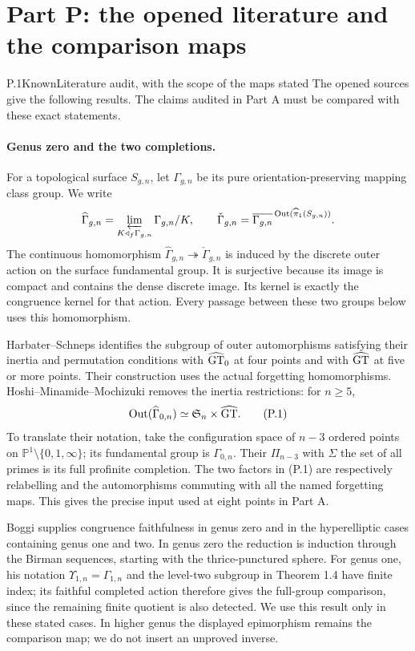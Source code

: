 \section{Part P: the opened literature and the comparison maps}

\begin{result}{P.1}{Known}{Literature audit, with the scope of the maps stated}
The opened sources give the following results. The claims audited in Part A must be compared with these exact statements.
\end{result}

\paragraph{Genus zero and the two completions.}
For a topological surface $S_{g,n}$, let $\Gamma_{g,n}$ be its pure orientation-preserving mapping class group. We write
\[
 \widehat\Gamma_{g,n}=\varprojlim_{K\triangleleft_f\Gamma_{g,n}}
          \Gamma_{g,n}/K,
 \qquad
 \check\Gamma_{g,n}
 =\overline{\Gamma_{g,n}}^{\,\operatorname{Out}(\widehat\pi_1(S_{g,n}))}.
\]
The continuous homomorphism
$\widehat\Gamma_{g,n}\twoheadrightarrow\check\Gamma_{g,n}$
is induced by the discrete outer action on the surface fundamental group. It is surjective because its image is compact and contains the dense discrete image. Its kernel is exactly the congruence kernel for that action. Every passage between these two groups below uses this homomorphism.

Harbater--Schneps \cite[Main Theorem and its corollary]{HS2000} identifies the subgroup of outer automorphisms satisfying their inertia and permutation conditions with $\widehat{\mathrm{GT}}_0$ at four points and with $\widehat{\mathrm{GT}}$ at five or more points. Their construction uses the actual forgetting homomorphisms. Hoshi--Minamide--Mochizuki \cite[Corollary 2.8]{HMM2022} removes the inertia restrictions: for $n\geq5$,
\[
 \operatorname{Out}(\widehat\Gamma_{0,n})\simeq\mathfrak S_n\times\widehat{\mathrm{GT}}.
 \tag{P.1}
\]
To translate their notation, take the configuration space of $n-3$ ordered points on $\mathbb P^1\setminus\{0,1,\infty\}$; its fundamental group is $\Gamma_{0,n}$. Their $\Pi_{n-3}$ with $\Sigma$ the set of all primes is its full profinite completion. The two factors in (P.1) are respectively relabelling and the automorphisms commuting with all the named forgetting maps. This gives the precise input used at eight points in Part A.

Boggi \cite[Corollary 5.4 and Theorem 1.4(ii)]{CA_Boggi2020} supplies congruence faithfulness in genus zero and in the hyperelliptic cases containing genus one and two. In genus zero the reduction is induction through the Birman sequences, starting with the thrice-punctured sphere. For genus one, his notation $\Upsilon_{1,n}=\Gamma_{1,n}$ and the level-two subgroup in Theorem 1.4 have finite index; its faithful completed action therefore gives the full-group comparison, since the remaining finite quotient is also detected. We use this result only in these stated cases. In higher genus the displayed epimorphism remains the comparison map; we do not insert an unproved inverse.

